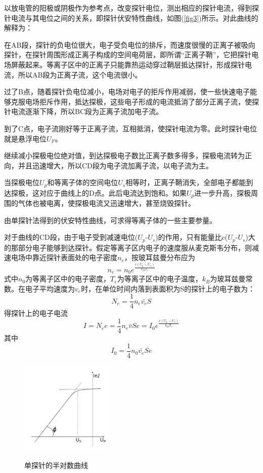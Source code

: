 \documentclass[a4paper]{article}
\begin{document}
以放电管的阳极或阴极作为参考点，改变探针电位，测出相应的探针电流，得到探针电流与其电位之间的关系，即探针伏安特性曲线，如图(\ref{fig3})所示。对此曲线的解释为：

在AB段，探针的负电位很大，电子受负电位的排斥，而速度很慢的正离子被吸向探针，在探针周围形成正离子构成的空间电荷层，即所谓“正离子鞘”，它把探针电场屏蔽起来。等离子区中的正离子只能靠热运动穿过鞘层抵达探针，形成探针电流，所以AB段为正离子流，这个电流很小。

过了B点，随着探针负电位减小，电场对电子的拒斥作用减弱，使一些快速电子能够克服电场拒斥作用，抵达探极，这些电子形成的电流抵消了部分正离子流，使探针电流逐渐下降，所以BC段为正离子流加电子流。

到了C点，电子流刚好等于正离子流，互相抵消，使探针电流为零。此时探针电位就是悬浮电位$U_F$。

继续减小探极电位绝对值，到达探极电子数比正离子数多得多，探极电流转为正向，并且迅速增大，所以CD段为电子流加离子流，以电子流为主。

当探极电位$U_p$和等离子体的空间电位$U_s$相等时，正离子鞘消失，全部电子都能到达探极，这对应于曲线上的D点。此后电流达到饱和。如果$U_p$进一步升高，探极周围的气体也被电离，使探极电流又迅速增大，甚至烧毁探针。

由单探针法得到的伏安特性曲线，可求得等离子体的一些主要参量。

对于曲线的CD段，由于电子受到减速电位($U_p$-$U_s$)的作用，只有能量比e($U_p$-$U_s$)大的那部分电子能够到达探针。假定等离子区内电子的速度服从麦克斯韦分布，则减速电场中靠近探针表面处的电子密度$n_e$，按玻耳兹曼分布应为
\begin{equation}
n_e = n_0e^{\frac{e(U_p-U_s)}{k_BT_e}}\label{eq1}
\end{equation}
式中$n_0$为等离子区中的电子密度，$T_e$为等离子区中的电子温度，$k_B$为玻耳兹曼常数。在电子平均速度为$v_e$时，在单位时间内落到表面积为S的探针上的电子数为：
\begin{equation}
N_e = \frac{1}{4}n_e\bar{v_e}S\label{eq2}
\end{equation}
得探针上的电子电流
\begin{equation}
I = N_ee = \frac{1}{4}n_e\bar{v}Se = I_0e^{\frac{e(U_p-U_s)}{k_BT_e}}\label{eq3}
\end{equation}
其中
\begin{equation}
I_0 = \frac{1}{4}n_0\bar{v_e}Se\label{eq4}
\end{equation}
\begin{figure}[!h]
\centering
\includegraphics[width=0.4\textwidth]{fig/fig4.pdf}\\
\caption{单探针的半对数曲线}\label{fig4}
\end{figure}
\end{document}

